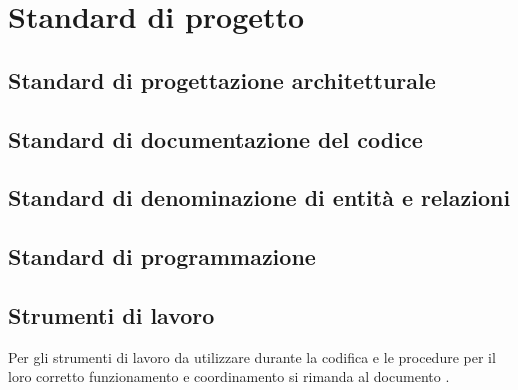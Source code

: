 \section{Standard di progetto}

\subsection{Standard di progettazione architetturale}

\subsection{Standard di documentazione del codice}

\subsection{Standard di denominazione di entità e relazioni}

\subsection{Standard di programmazione}

\subsection{Strumenti di lavoro}
	Per gli strumenti di lavoro da utilizzare durante la codifica e le procedure per il loro corretto funzionamento e coordinamento si rimanda al documento \NormeDiProgetto{}.